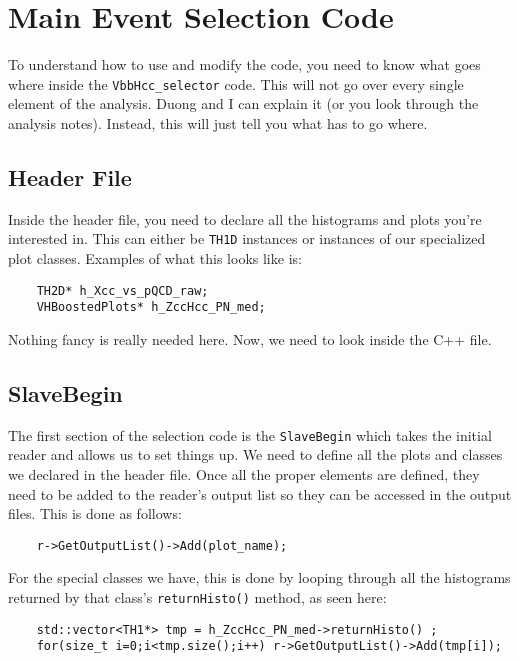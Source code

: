\chapter{Main Event Selection Code}\label{ch:sel_code}

To understand how to use and modify the code, you need to know what goes where inside the \verb|VbbHcc_selector| code. This will not go over every single element of the analysis. Duong and I can explain it (or you look through the analysis notes). Instead, this will just tell you what has to go where.

\section{Header File}
Inside the header file, you need to declare all the histograms and plots you're interested in. This can either be \verb|TH1D| instances or instances of our specialized plot classes. Examples of what this looks like is:

\begin{verbatim}
    TH2D* h_Xcc_vs_pQCD_raw;
    VHBoostedPlots* h_ZccHcc_PN_med;
\end{verbatim}

\noindent Nothing fancy is really needed here. Now, we need to look inside the C++ file.

\section{SlaveBegin}
The first section of the selection code is the \verb|SlaveBegin| which takes the initial reader and allows us to set things up. We need to define all the plots and classes we declared in the header file. Once all the proper elements are defined, they need to be added to the reader's output list so they can be accessed in the output files. This is done as follows:

\begin{verbatim}
    r->GetOutputList()->Add(plot_name);
\end{verbatim}

\noindent For the special classes we have, this is done by looping through all the histograms returned by that class's \verb|returnHisto()| method, as seen here:

\begin{verbatim}
    std::vector<TH1*> tmp = h_ZccHcc_PN_med->returnHisto() ;
    for(size_t i=0;i<tmp.size();i++) r->GetOutputList()->Add(tmp[i]);
\end{verbatim}

